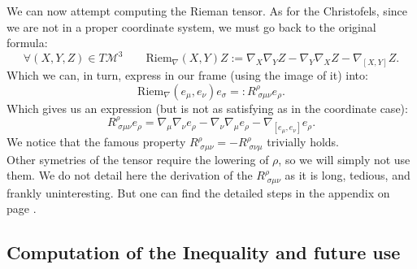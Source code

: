 \documentclass[a4paper,11pt]{article}
\numberwithin{equation}{section}
\theoremstyle{definition}
\begin{document}
We can now attempt computing the Rieman tensor. As for the Christofels, since we are not in a proper coordinate system, we must go back to the original formula:
\begin{equation}
    \forall (X,Y,Z)\in T\mathcal{M}^3 \quad \quad \mathrm{Riem}_\nabla (X,Y)Z:= \nabla_X\nabla_YZ-\nabla_Y\nabla_XZ-\nabla_{[X,Y]}Z.
\end{equation}
Which we can, in turn, express in our frame (using the image of it) into:
\begin{equation}
\mathrm{Riem}_\nabla (e_\mu,e_\nu)e_\sigma =: R^\rho_{\;\sigma\mu\nu} e_\rho.
\end{equation}
Which gives us an expression (but is not as satisfying as in the coordinate case):
\begin{equation}\label{Riem_munu}
    R^\rho_{\;\sigma\mu\nu} e_\rho = \nabla_\mu\nabla_\nu e_\rho-\nabla_\nu\nabla_\mu e_\rho-\nabla_{[e_\mu,e_\nu]}e_\rho.
\end{equation}
We notice that the famous property $R^\rho_{\;\sigma\mu\nu}=-R^\rho_{\;\sigma\nu\mu}$ trivially holds.\\
Other symetries of the tensor require the lowering of $\rho$, so we will simply not use them. We do not detail here the derivation of the $R^\rho_{\;\sigma\mu\nu}$ as it is long, tedious, and frankly uninteresting. But one can find the detailed steps in the appendix on page \pageref{CompR}.
\subsection{Computation of the Inequality and future use}
\end{document}
